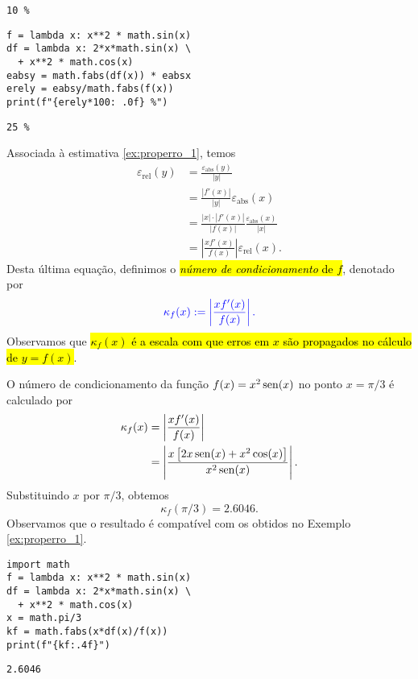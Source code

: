 \begin{ex}
\begin{verbatim}
10 %
\end{verbatim}

\begin{lstlisting}
f = lambda x: x**2 * math.sin(x) 
df = lambda x: 2*x*math.sin(x) \
  + x**2 * math.cos(x)
eabsy = math.fabs(df(x)) * eabsx
erely = eabsy/math.fabs(f(x))
print(f"{erely*100: .0f} %")
\end{lstlisting}

\begin{verbatim}
25 %
\end{verbatim}
  
\end{ex}

Associada à estimativa \eqref{ex:properro_1}, temos
\begin{align*}
  \varepsilon_{\text{rel}}(y) &= \frac{\varepsilon_{\text{abs}}(y)}{|y|}\\
  &= \frac{|f'(x)|}{|y|}\varepsilon_{\text{abs}}(x)\\
  &= \frac{|x|\cdot |f'(x)|}{|f(x)|}\frac{\varepsilon_{\text{abs}}(x)}{|x|}\\
  &= \left|\frac{xf'(x)}{f(x)}\right|\varepsilon_{\text{rel}}(x).
\end{align*}
Desta última equação, definimos o \hl{\emph{número de condicionamento} de $f$}, denotado por
\begin{equation}
  \color{blue}\kappa_f(x) := \left|\frac{xf'(x)}{f(x)}\right|.
\end{equation}
Observamos que \hl{$\kappa_f(x)$ é a escala com que erros em $x$ são propagados no cálculo de $y = f(x)$}.

\begin{ex}\label{ex:numcond_1}
  O número de condicionamento da função $f(x) = x^2\operatorname{sen}(x)$ no ponto $x=\pi/3$ é calculado por
  \begin{align}
    \kappa_f(x) &= \left|\frac{xf'(x)}{f(x)}\right|\\
                &= \left|\frac{x\left[2x\operatorname{sen}(x)+x^2\cos(x)\right]}{x^2\operatorname{sen}(x)}\right|. 
  \end{align}
  Substituindo $x$ por $\pi/3$, obtemos
  \begin{equation}
    \kappa_f(\pi/3) = 2.6046.
  \end{equation}
  Observamos que o resultado é compatível com os obtidos no Exemplo \ref{ex:properro_1}.
  
  
\begin{lstlisting}
import math
f = lambda x: x**2 * math.sin(x) 
df = lambda x: 2*x*math.sin(x) \
  + x**2 * math.cos(x)
x = math.pi/3
kf = math.fabs(x*df(x)/f(x))
print(f"{kf:.4f}")
\end{lstlisting}

\begin{verbatim}
2.6046
\end{verbatim}
  
\end{ex}

